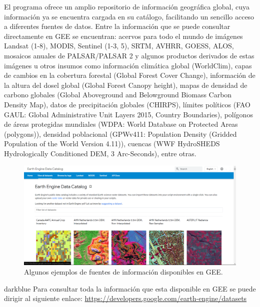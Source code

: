 \documentclass[
  12pt,
  letterpaper,
  twoside]{book}
\begin{document}
El programa ofrece un amplio repositorio de información geográfica global, cuya información ya se encuentra cargada en su catálogo, facilitando un sencillo acceso a diferentes fuentes de datos. Entre la información que se puede consultar directamente en GEE se encuentran: acervos para todo el mundo de imágenes Landsat (1-8), MODIS, Sentinel (1-3, 5), SRTM, AVHRR, GOESS, ALOS, mosaicos anuales de PALSAR/PALSAR 2 y algunos productos derivados de estas imágenes u otros insumos como información climática global (WorldClim), capas de cambios en la cobertura forestal (Global Forest Cover Change), información de la altura del dosel global (Global Forest Canopy height), mapas de densidad de carbono globales (Global Aboveground and Belowground Biomass Carbon Density Map), datos de precipitación globales (CHIRPS), límites políticos (FAO GAUL: Global Administrative Unit Layers 2015, Country Boundaries), polígonos de áreas protegidas mundiales (WDPA: World Database on Protected Areas (polygons)), densidad poblacional (GPWv411: Population Density (Gridded Population of the World Version 4.11)), cuencas (WWF HydroSHEDS Hydrologically Conditioned DEM, 3 Arc-Seconds), entre otras.

\begin{figure}

{\centering \includegraphics[width=1\linewidth]{Img/Datasets} 

}

\caption{Algunos ejemplos de fuentes de información disponibles en GEE.}\label{fig:unnamed-chunk-1}
\end{figure}

\begin{bluebox2}

\begin{awesomeblock}{5pt}{\faLightbulb}{darkblue}
Para consultar toda la información que esta disponible en GEE se puede dirigir al siguiente enlace: \url{https://developers.google.com/earth-engine/datasets}

\end{awesomeblock}

\end{bluebox2}
\end{document}
